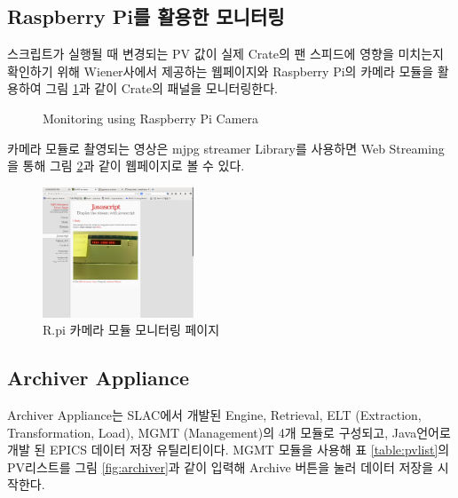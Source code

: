 \documentclass[11pt
  , a4paper
  , article
  , oneside
]{memoir}
\begin{document}
\subsection{Raspberry Pi를 활용한 모니터링}
스크립트가 실행될 때 변경되는 PV 값이 실제 Crate의 팬 스피드에 영향을 미치는지 확인하기 위해 Wiener사에서 제공하는 웹페이지와 Raspberry Pi의 카메라 모듈을 활용하여 그림 \ref{fig:rpimonitoring}과 같이 Crate의 패널을 모니터링한다.

\begin{figure}[h!]
  \centering
              \hfill
              \hfill
  \caption
      {
Monitoring using Raspberry Pi Camera
      }
 \label{fig:rpimonitoring}
\end{figure}

카메라 모듈로 촬영되는 영상은 mjpg streamer Library를 사용하면 Web Streaming을 통해 그림 \ref{fig:javapage}과 같이 웹페이지로 볼 수 있다. 

\begin{figure}[h!]
  \centering
  \includegraphics[width=0.4\textwidth]{./images/javapage.eps}
  \caption{R.pi 카메라 모듈 모니터링 페이지}
  \label{fig:javapage}   
\end{figure}

\clearpage


\subsection{Archiver Appliance}
Archiver Appliance는 SLAC에서 개발된 Engine, Retrieval, ELT (Extraction, Transformation, Load), MGMT (Management)의 4개 모듈로 구성되고, Java언어로 개발 된 EPICS 데이터 저장 유틸리티이다. MGMT 모듈을 사용해 표 \ref{table:pvlist}의 PV리스트를 그림 \ref{fig:archiver}과 같이 입력해 Archive 버튼을 눌러 데이터 저장을 시작한다. 
\end{document}
